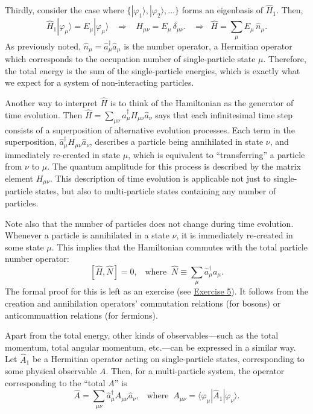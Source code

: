 \documentclass[pra,12pt]{revtex4}
\begin{document}
Thirdly, consider the case where
$\{|\varphi_1\rangle,|\varphi_2\rangle,\dots\}$ forms an eigenbasis of
$\hat{H}_1$.  Then,
$$\hat{H}_1|\varphi_\mu\rangle = E_\mu |\varphi_\mu\rangle \;\;\;\Rightarrow\;\;\; H_{\mu\nu} = E_\mu\,\delta_{\mu\nu}. \;\;\;\Rightarrow \;\; \hat{H} = \sum_{\mu} E_\mu \,\hat{n}_\mu.$$
As previously noted, $\hat{n}_\mu = \hat{a}^\dagger_\mu \hat{a}_\mu$
is the number operator, a Hermitian operator which corresponds to the
occupation number of single-particle state $\mu$.  Therefore, the
total energy is the sum of the single-particle energies, which is
exactly what we expect for a system of non-interacting particles.

Another way to interpret $\hat{H}$ is to think of the Hamiltonian as
the generator of time evolution.  Then $\hat{H} = \sum_{\mu\nu}
\hat{a}^\dagger_\mu H_{\mu\nu} \hat{a}_\nu$ says that each
infinitesimal time step consists of a superposition of alternative
evolution processes.  Each term in the superposition,
$\hat{a}^\dagger_\mu H_{\mu\nu} \hat{a}_\nu$, describes a particle
being annihilated in state $\nu$, and immediately re-created in state
$\mu$, which is equivalent to ``transferring'' a particle from $\nu$
to $\mu$.  The quantum amplitude for this process is described by the
matrix element $H_{\mu\nu}$.  This description of time evolution is
applicable not just to single-particle states, but also to
multi-particle states containing any number of particles.

Note also that the number of particles does not change during time
evolution.  Whenever a particle is annihilated in a state $\nu$, it is
immediately re-created in some state $\mu$.  This implies that the
Hamiltonian commutes with the total particle number operator:
$$[\hat{H}, \hat{N}] = 0, \;\;\;\mathrm{where}\;\;\hat{N} \equiv \sum_\mu \hat{a}_\mu^\dagger a_\mu.$$
The formal proof for this is left as an exercise (see
\hyperref[ex:n_conserved]{Exercise 5}).  It follows from the creation
and annihilation operators' commutation relations (for bosons) or
anticommuattion relations (for fermions).

Apart from the total energy, other kinds of observables---such as the
total momentum, total angular momentum, etc.---can be expressed in a
similar way.  Let $\hat{A}_1$ be a Hermitian operator acting on
single-particle states, corresponding to some physical observable $A$.
Then, for a multi-particle system, the operator corresponding to the
``total $A$'' is
$$\hat{A} = \sum_{\mu\nu} \hat{a}^\dagger_\mu A_{\mu\nu} \hat{a}_\nu, \;\;\; \mathrm{where}\;\; A_{\mu\nu} = \langle\varphi_\mu|\hat{A}_1|\varphi_\nu\rangle.$$
\end{document}
